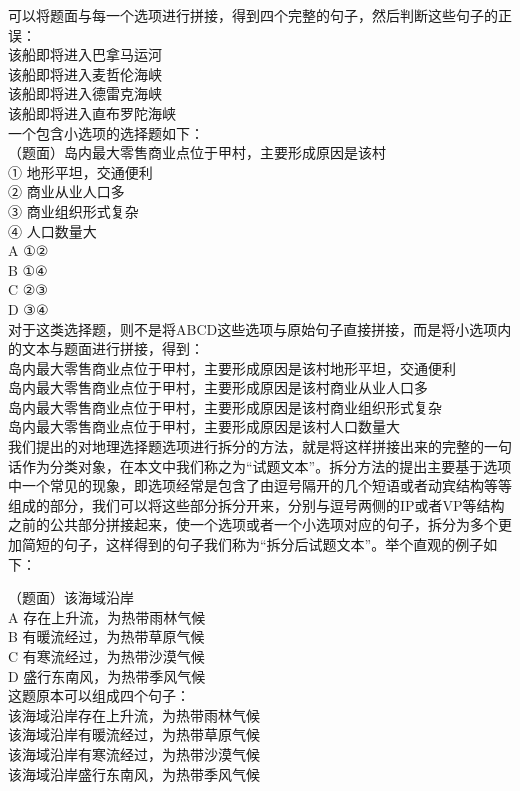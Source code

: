 \documentclass[master, winfont]{njuthesis}
\begin{document}
可以将题面与每一个选项进行拼接，得到四个完整的句子，然后判断这些句子的正误：\\
该船即将进入巴拿马运河\\
该船即将进入麦哲伦海峡\\
该船即将进入德雷克海峡\\
该船即将进入直布罗陀海峡\\

一个包含小选项的选择题如下：\\
（题面）岛内最大零售商业点位于甲村，主要形成原因是该村 \\
① 地形平坦，交通便利\\
② 商业从业人口多\\
③ 商业组织形式复杂\\
④ 人口数量大\\
A ①②\\
B ①④\\
C ②③\\
D ③④\\

对于这类选择题，则不是将ABCD这些选项与原始句子直接拼接，而是将小选项内的文本与题面进行拼接，得到：\\
岛内最大零售商业点位于甲村，主要形成原因是该村地形平坦，交通便利\\
岛内最大零售商业点位于甲村，主要形成原因是该村商业从业人口多\\
岛内最大零售商业点位于甲村，主要形成原因是该村商业组织形式复杂\\
岛内最大零售商业点位于甲村，主要形成原因是该村人口数量大\\

我们提出的对地理选择题选项进行拆分的方法，就是将这样拼接出来的完整的一句话作为分类对象，在本文中我们称之为“试题文本”。拆分方法的提出主要基于选项中一个常见的现象，即选项经常是包含了由逗号隔开的几个短语或者动宾结构等等组成的部分，我们可以将这些部分拆分开来，分别与逗号两侧的IP或者VP等结构之前的公共部分拼接起来，使一个选项或者一个小选项对应的句子，拆分为多个更加简短的句子，这样得到的句子我们称为“拆分后试题文本”。举个直观的例子如下：

（题面）该海域沿岸\\
A 存在上升流，为热带雨林气候\\
B 有暖流经过，为热带草原气候\\
C 有寒流经过，为热带沙漠气候\\
D 盛行东南风，为热带季风气候\\

这题原本可以组成四个句子：\\
该海域沿岸存在上升流，为热带雨林气候\\
该海域沿岸有暖流经过，为热带草原气候\\
该海域沿岸有寒流经过，为热带沙漠气候\\
该海域沿岸盛行东南风，为热带季风气候\\
\end{document}
